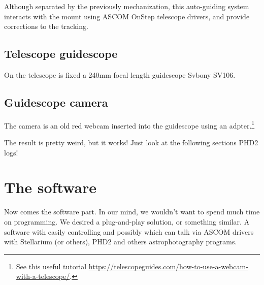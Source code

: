 \documentclass{article}
\begin{document}
\begin{multicols}{2}
        Although separated by the previously mechanization, this auto-guiding system interacts with the mount using ASCOM OnStep telescope drivers, and provide corrections to the tracking.
        
        \subsection{Telescope guidescope}
        On the telescope is fixed a 240mm focal length guidescope Svbony SV106.

        \subsection{Guidescope camera}
        The camera is an old red webcam inserted into the guidescope using an adpter.\footnote{See this useful tutorial \url{https://telescopeguides.com/how-to-use-a-webcam-with-a-telescope/}.}

        The result is pretty weird, but it works!
        Just look at the following sections PHD2 logs!

        \section{The software}
        Now comes the software part.
        In our mind, we wouldn't want to spend much time on programming.
        We desired a plug-and-play solution, or something similar.
        A software with easily controlling and possibly which can talk via ASCOM drivers with Stellarium (or others), PHD2 and others astrophotography programs.


\end{multicols}
\end{document}
